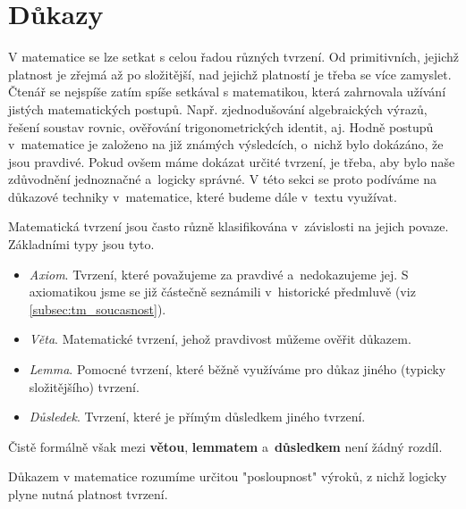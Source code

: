\chapter{Důkazy}\label{chap:dukazy}
V matematice se lze setkat s celou řadou různých tvrzení. Od primitivních, jejichž platnost je zřejmá až po složitější, nad jejichž platností je třeba se více zamyslet. Čtenář se nejspíše zatím spíše setkával s matematikou, která zahrnovala užívání jistých matematických postupů. Např. zjednodušování algebraických výrazů, řešení soustav rovnic, ověřování trigonometrických identit, aj. Hodně postupů v~matematice je založeno na již známých výsledcích, o~nichž bylo dokázáno, že jsou pravdivé. Pokud ovšem máme dokázat určité tvrzení, je třeba, aby bylo naše zdůvodnění jednoznačné a~logicky správné. V této sekci se proto podíváme na důkazové techniky v~matematice, které budeme dále v~textu využívat.\par
Matematická tvrzení jsou často různě klasifikována v~závislosti na jejich povaze. Základními typy jsou tyto. 
\begin{itemize}
    \item \emph{Axiom}. Tvrzení, které považujeme za pravdivé a~nedokazujeme jej. S axiomatikou jsme se již částečně seznámili v~historické předmluvě (viz \ref{subsec:tm_soucasnost}).
    \item \emph{Věta}. Matematické tvrzení, jehož pravdivost můžeme ověřit důkazem.
    \item \emph{Lemma}. Pomocné tvrzení, které běžně využíváme pro důkaz jiného (typicky složitějšího) tvrzení.
    \item \emph{Důsledek}. Tvrzení, které je přímým důsledkem jiného tvrzení.
\end{itemize}
Čistě formálně však mezi \textbf{větou}, \textbf{lemmatem} a~\textbf{důsledkem} není žádný rozdíl.\par
Důkazem v matematice rozumíme určitou "posloupnost" výroků, z nichž logicky plyne nutná platnost tvrzení.
